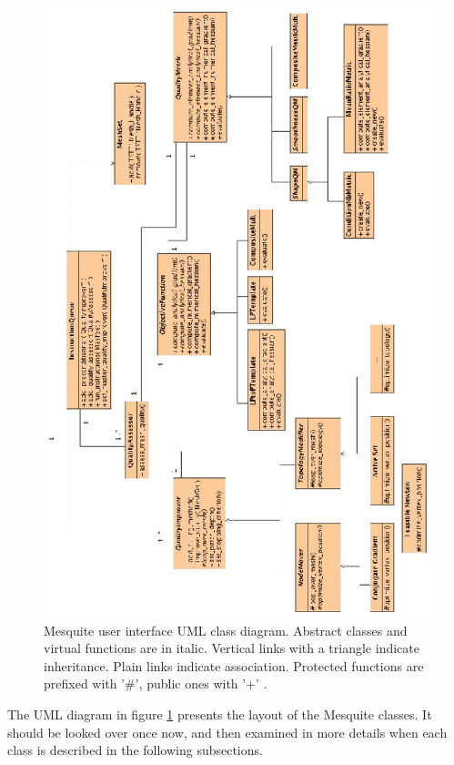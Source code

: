 \documentclass[letter]{report}
\begin{document}
\begin{figure}[htbp]
\begin{center}
    \includegraphics{MesquiteUI.eps}
    \caption{Mesquite user interface UML class diagram.  Abstract
             classes and virtual functions are in italic. Vertical
             links with a triangle indicate inheritance. Plain links
             indicate association. Protected functions are prefixed
             with '\#', public ones with '+' .}
    \label{fig:uml}
\end{center}
\end{figure}

The UML diagram in figure \ref{fig:uml} presents the layout of the Mesquite classes. It should be
looked over once now, and then examined in more details when each class is described in the
following subsections.
\end{document}
